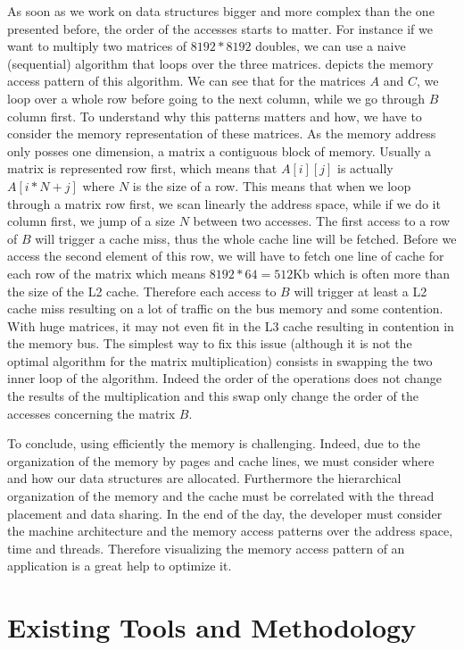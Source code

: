 As soon as we work on data structures bigger and more complex than the one presented before, the order of the accesses starts to matter.
For instance if we want to multiply two matrices of $8192*8192$ doubles, we can use a naive (sequential) algorithm that loops over the three matrices.
 depicts the memory access pattern of this algorithm.
We can see that for the matrices $A$ and $C$, we loop over a whole row before going to the next column, while we go through $B$ column first.
To understand why this patterns matters and how, we have to consider the memory representation of these matrices.
As the memory address only posses one dimension, a matrix a contiguous block of memory.
Usually a matrix is represented row first, which means that $A[i][j]$ is actually $A[i*N+j]$ where $N$ is the size of a row.
This means that when we loop through a matrix row first, we scan linearly the address space, while if we do it column first, we jump of a size $N$ between two accesses.
The first access to a row of $B$ will trigger a cache miss, thus the whole cache line will be fetched.
Before we access the second element of this row, we will have to fetch one line of cache for each row of the matrix which means $8192*64=512$Kb which is often more than the size of the L2 cache.
Therefore each access to $B$ will trigger at least a L2 cache miss resulting on a lot of traffic on the bus memory and some contention.
With huge matrices, it may not even fit in the L3 cache resulting in contention in the memory bus.
The simplest way to fix this issue (although it is not the optimal algorithm for the matrix multiplication) consists in swapping the two inner loop of the algorithm.
Indeed the order of the operations does not change the results of the multiplication and this swap only change the order of the accesses concerning the matrix $B$.

To conclude, using efficiently the memory is challenging.
Indeed, due to the organization of the memory by pages and cache lines, we must consider where and how our data structures are allocated.
Furthermore the hierarchical organization of the memory and the cache must be correlated with the thread placement and data sharing.
In the end of the day, the developer must consider the machine architecture and the memory access patterns over the address space, time and threads.
Therefore visualizing the memory access pattern of an application is a great help to optimize it.

\section{Existing Tools and Methodology}
\label{sec:mem-tools}

